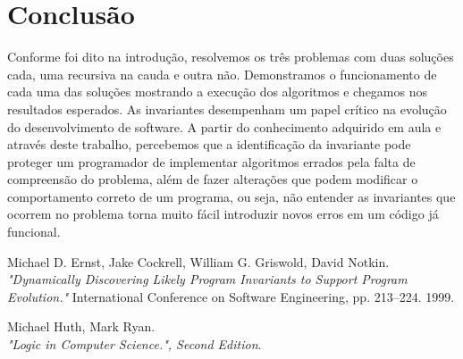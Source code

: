 \documentclass{article}
\begin{document}
\section{Conclusão}
Conforme foi dito na introdução, resolvemos os três problemas com duas soluções cada, uma recursiva na cauda e outra não.
Demonstramos o funcionamento de cada uma das soluções mostrando a execução dos algoritmos e chegamos nos resultados esperados.
As invariantes desempenham um papel crítico na evolução do desenvolvimento de software. A partir do conhecimento
adquirido em aula e através deste trabalho, percebemos que a identificação da invariante pode proteger um programador
de implementar algoritmos errados pela falta de compreensão do problema, além de fazer alterações que podem modificar o
comportamento correto de um programa, ou seja, não entender as invariantes que ocorrem
no problema torna muito fácil introduzir novos erros em um código já funcional.

\begin{thebibliography}{9}
	Michael D. Ernst, Jake Cockrell, William G. Griswold, David Notkin.\\
	\emph{"Dynamically Discovering Likely Program Invariants to Support Program Evolution."}
	International Conference on Software Engineering, pp. 213–224. 1999.

	Michael Huth, Mark Ryan.\\
	\emph{"Logic in Computer Science.", Second Edition}.
\end{thebibliography}
\end{document}
